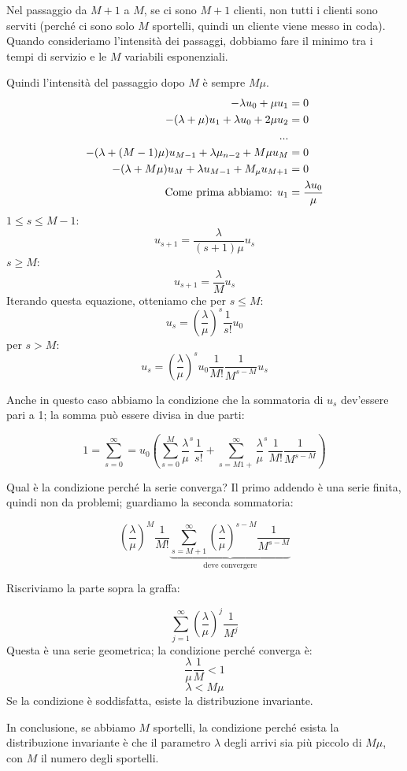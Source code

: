 \documentclass[a4paper,12pt]{book}
\begin{document}
Nel passaggio da $ M+1 $ a $ M $, se ci sono $ M+1 $ clienti, non tutti i clienti sono serviti (perché ci sono solo $ M $ sportelli, quindi un cliente viene messo in coda). Quando consideriamo l'intensità dei passaggi, dobbiamo fare il minimo tra i tempi di servizio e le $ M $ variabili esponenziali.

Quindi l'intensità del passaggio dopo $ M $ è sempre $ M\mu $.
\begin{align*}
	-\lambda u_0 + \mu u_1 & = 0 \\
	-(\lambda + \mu)u_1 + \lambda u_0 + 2\mu u_2 & = 0 \\
	... \\
	-(\lambda + (M-1)\mu )u_{M-1} +  \lambda\mu_{n-2} + M\mu u_M & = 0 \\ 
	-(\lambda + M\mu) u_M + \lambda u_{M-1} + M_\mu u_{M+1} & = 0 \\
	\textnormal{Come prima abbiamo: }u_1 & = \frac{\lambda u_0}{\mu}
\end{align*}
$ 1 \le s \le M -1 $:
$$ u_{s+1} = \frac{\lambda}{(s+1)\mu} u_s $$
$ s \ge M $:
$$ u_{s+1} = \frac{\lambda}{M}u_s $$
Iterando questa equazione, otteniamo che per $ s \le M $:
$$ u_s = \left(\frac{\lambda}{\mu}\right)^s \frac{1}{s!} u_0 $$
per $ s > M $:
$$ u_s = \left(\frac{\lambda}{\mu}\right)^s u_0 \frac{1}{M!}\frac{1}{M^{s-M}} u_s $$

Anche in questo caso abbiamo la condizione che la sommatoria di $ u_s $ dev'essere pari a 1; la somma può essere divisa in due parti:

$$ 1 = \sum_{s=0}^{\infty} = u_0 \left( \sum_{s=0}^{M} \frac{\lambda}{\mu}^s \frac{1}{s!} + \sum_{s=M1+}^{\infty}\frac{\lambda}{\mu}^s \frac{1}{M!} \frac{1}{M^{s-M}} \right) $$ 

Qual è la condizione perché la serie converga? Il primo addendo è una serie finita, quindi non da problemi; guardiamo la seconda sommatoria:

$$ \left( \frac{\lambda}{\mu} \right)^M \frac{1}{M!} \underbrace{\sum_{s=M+1}^\infty \left(\frac{\lambda}{\mu}\right)^{s-M} \frac{1}{M^{s-M}} }_{\text{deve convergere}} $$

Riscriviamo la parte sopra la graffa:

$$ \sum_{j=1}^\infty \left( \frac{\lambda}{\mu} \right)^j \frac{1}{M^j} $$
Questa è una serie geometrica; la condizione perché converga è:
$$ \frac{\lambda}{\mu} \frac{1}{M} < 1 $$
$$ \lambda < M\mu $$
Se la condizione è soddisfatta, esiste la distribuzione invariante.

In conclusione, se abbiamo $ M $ sportelli, la condizione perché esista la distribuzione invariante è che il parametro $\lambda$ degli arrivi sia più piccolo di $ M\mu $, con $ M $ il numero degli sportelli. 
\end{document}
